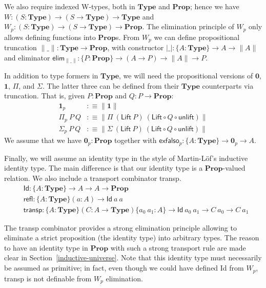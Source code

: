 \documentclass[a4paper,UKenglish,cleveref, autoref, thm-restate]{lipics-v2019}
\newcommand{\mType}{\mathbf{Type}}
\newcommand{\mProp}{\mathbf{Prop}}
\begin{document}
We also require indexed W-types, both in $\mType$ and $\mProp$; hence we have $W
: (S : \mType) \to (S \to \mType) \to \mType$ and $W_p : (S : \mType) \to (S \to
\mType) \to \mProp$. The elimination principle of $W_p$ only allows defining functions into $\mProp$s.
%
From $W_p$ we can define propositional truncation $\|\_\| : \mType \to \mProp$, with constructor
  $|\_| : \{A : \mType \} \to A \to \| A \|$ and eliminator
  $\textsf{elim}_{\|\_\|} : \{P : \mProp \} \to (A \to P) \to \| A \| \to P$.

In addition to type formers in $\mType$, we will need the propositional versions
of $\mathbf{0}$, $\mathbf{1}$, $\Pi$, and $\Sigma$. The latter three can be defined from their
$\mType$ counterparts via truncation. That is, given $P : \mProp$ and $Q : P \to
\mProp$:
%
\begin{align*}
  \mathbf{1}_p & :\equiv \| \mathbf{1} \| \\
  \Pi_p\ P\ Q & :\equiv \| \Pi\ (\textsf{Lift} \ P)\ (\textsf{Lift} \circ Q \circ \textsf{unlift}) \| \\
  \Sigma_p\ P\ Q & :\equiv \| \Sigma\ (\textsf{Lift} \ P)\ (\textsf{Lift} \circ Q \circ \textsf{unlift}) \|
\end{align*}
We assume that we have
$\mathbf{0}_p:\mProp$ together with $\mathsf{exfalso}_p :\{A:\mType \} \to \mathbf{0}_p \to A$.

Finally, we will assume an identity type in the style of Martin-L\"of's
inductive identity type. The main difference is that our identity type is a
$\mProp$-valued relation. We also include a transport combinator
\textsf{transp}.
%
\begin{align*}
  & \textsf{Id} : \{A : \mType \} \to A \to A \to \mProp \\
  & \textsf{refl} : \{A : \mType \} (a : A) \to \textsf{Id}\ a\ a \\
  & \textsf{transp} : \{A : \mType \} (C : A \to \mType) \{a_0\ a_1 : A\} \to \textsf{Id}\ a_0\ a_1 \to C\ a_0 \to C\ a_1
\end{align*}

The \textsf{transp} combinator provides a strong elimination principle allowing
to eliminate a strict proposition (the identity type) into arbitrary types.
%
The reason to have an identity type in $\mProp$ with such a strong transport
rule are made clear in Section~\ref{inductive-universe}.
%
Note that this identity type must necessarily be assumed as primitive; in fact,
even though we could have defined \textsf{Id} from $W_p$, \textsf{transp} is not
definable from $W_p$ elimination.
\end{document}
